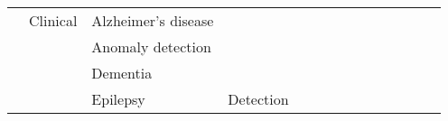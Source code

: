 \begin{tabular}{p{1.5cm}p{1.5cm}p{1.5cm}p{1.5cm}p{0.6cm}p{0.6cm}p{0.6cm}p{0.6cm}p{0.6cm}p{0.6cm}p{0.6cm}p{0.6cm}p{0.6cm}p{0.6cm}}
                                & Clinical & Alzheimer's disease &   &                                                             &                                                                                                         \cite{Morabito2016} &                                                                        &                                      &                                                            &                      &                       &                                 &                         &                                                                      \\
                                &                 & Anomaly detection &   &                                                             &                                                                                                                             &                                                                        &                    \cite{Wulsin2011} &                                                            &                      &                       &                                 &                         &                                                                      \\
                                &                 & Dementia &   &                                         \cite{Morabito2017} &                                                                                                                             &                                                                        &                                      &                                                            &                      &                       &                                 &                         &                                                                      \\
                                &                 & Epilepsy & Detection &                          \cite{Yuan2018a, Golmohammadi2017} &                                                 \cite{Hao2018, Ullah2018, OShea2018, OShea2017, Acharya2017, Thodoroff2016} &  \cite{VanPutten2018a, Golmohammadi2017b, Shah2017, Golmohammadi2017a} &                    \cite{Turner2014} &                                      \cite{Omerhodzic2013} &                      &       \cite{Taqi2017} &                                 &                         &  \cite{Hussein2018, Ahmedt-Aristizabal2018, Talathi2017, Naderi2010} \\

\end{tabular}

